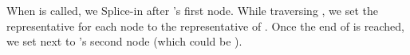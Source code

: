 When  is called, we Splice-in  after 's first node.
While traversing , we set the representative for each node to the
representative of . Once the end of  is reached, we set next to 's
second node (which could be ).
